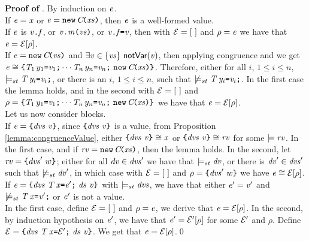 \medskip
\noindent
{\bf Proof of }.
By induction on $\mathit{e}$. \\
If $\mathit{e}=\mathit{x}$ or $\mathit{e}=\texttt{new}\,\mathit{C}\!\texttt{(}{\mathit{xs}}\texttt{)}$, then $\mathit{e}$ is a well-formed value.\\
If $\mathit{e}$ is  ${\mathit{v}}\texttt{.}\mathit{f}$, or ${\mathit{v}}\texttt{.}\mathit{m}\texttt{(}{\mathit{vs}}\texttt{)}$,
or ${\mathit{v}}\texttt{.}\mathit{f}\texttt{=}\mathit{v}$, then with ${\cal{E}}=[\ ]$ and ${\rho}=\mathit{e}$
we have that $\mathit{e}={\cal{E}}[{\rho}]$.\\
If $\mathit{e}=\texttt{new}\,\mathit{C}\!\texttt{(}{\mathit{vs}}\texttt{)}$ and
$\exists\val\in\{\vals\}\ \notRef{\val}$, then applying congruence  and  we get
${\mathit{e}}\cong{\texttt{\{}\mathit{T}_1\,y_1\texttt{=}\mathit{v}_1\texttt{;}\cdots\mathit{T}_n\,y_n\texttt{=}\mathit{v}_n\texttt{;}\ \texttt{new}\,\mathit{C}\!\texttt{(}{\mathit{xs}}\texttt{)}\texttt{\}}}$.
Therefore, either for all $i$, $1\leq i\leq n$, $\models_{st}\mathit{T}\,\mathit{y}_i\texttt{=}\mathit{v}_i\texttt{;}$, or there is
an $i$, $1\leq i\leq n$,  such that $\not\models_{st}\mathit{T}\,\mathit{y}_i\texttt{=}\mathit{v}_i\texttt{;}$. In the first case the lemma holds, and in the
second with ${\cal{E}}=[\ ]$ and ${\rho}=\texttt{\{}\mathit{T}_1\,y_1\texttt{=}\mathit{v}_1\texttt{;}\cdots\mathit{T}_n\,y_n\texttt{=}\mathit{v}_n\texttt{;}\ \texttt{new}\,\mathit{C}\!\texttt{(}{\mathit{xs}}\texttt{)}\texttt{\}}$
we have that $\mathit{e}={\cal{E}}[{\rho}]$. \\
Let us now consider blocks.\\
If $\mathit{e}=\texttt{\{}\mathit{dvs}\ \mathit{v}\texttt{\}}$, since $\texttt{\{}\mathit{dvs}\ \mathit{v}\texttt{\}}$ is a value,
from Proposition \ref{lemma:congruenceValue}, either ${\texttt{\{}\mathit{dvs}\ \mathit{v}\texttt{\}}}\cong{\mathit{x}}$ or 
${\texttt{\{}\mathit{dvs}\ \mathit{v}\texttt{\}}}\cong{\mathit{rv}}$ for some $\models\mathit{rv}$. In the first case, 
and if $\mathit{rv}=\texttt{new}\,\mathit{C}\!\texttt{(}{\mathit{xs}}\texttt{)}$, then the lemma holds. 
In the second, let $\mathit{rv}=\texttt{\{}\mathit{dvs}'\ w\texttt{\}}$; either for all $\mathit{dv}\in\mathit{dvs}'$
we have that $\models_{st}\mathit{dv}$, or there is $\mathit{dv}'\in\mathit{dvs}'$ such that $\not\models_{st}\mathit{dv}'$, in which
case with ${\cal{E}}=[\ ]$ and ${\rho}=\texttt{\{}\mathit{dvs}'\ w\texttt{\}}$ we have ${\mathit{e}}\cong{{\cal{E}}[{\rho}]}$. \\
If $\e=\Block{\dvs\ \Dec{\T}{\x}{\e'}\ \decs}{\val}$ with $\models_{st}\mathit{dvs}$, we have that 
either $\mathit{e}'=\mathit{v}'$ and $\not\models_{st}\mathit{T}\,\mathit{x}\texttt{=}\mathit{v}'\texttt{;}$ or $\mathit{e}'$ is not a value.\\
In the first case, define ${\cal{E}}=[\ ]$ and ${\rho}=\mathit{e}$, we derive that $\mathit{e}={\cal{E}}[{\rho}]$.
In the second,
by induction hypothesis on $\mathit{e}'$, we have that
$\mathit{e}'={\cal{E}'}[{\rho}]$ for some ${\cal{E}'}$ and $\rho$. Define $\ctx=\Block{\dvs\ \Dec{\T}{\x}{\ctxP}\ \decs}{\val}$.
We get that $\mathit{e}={\cal{E}}[\rho]$.\qed











